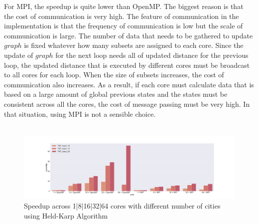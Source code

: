 \documentclass{article}
\begin{document}
    For MPI, the speedup is quite lower than OpenMP. The biggest reason is that the cost of communication is very high. The feature of communication in the implementation is that the frequency of communication is low but the scale of communication is large. The number of data that needs to be gathered to update $graph$ is fixed whatever how many subsets are assigned to each core. Since the update of $graph$ for the next loop needs all of updated distance for the previous loop, the updated distance that is executed by different cores must be broadcast to all cores for each loop. When the size of subsets increases, the cost of communication also increases. As a result, if each core must calculate data that is based on a large amount of global previous states and the states must be consistent across all the cores, the cost of message passing must be very high. In that situation, using MPI is not a sensible choice.\\\\

    \begin{figure}
        \centering
        \centerline{\includegraphics[scale=0.17]{exact_openmp_mpi.png}}
        \caption{Speedup across 1|8|16|32|64 cores with different number of cities using Held-Karp Algorithm}
        \label{fig:exact_openmp_mpi}
    \end{figure}
\end{document}
